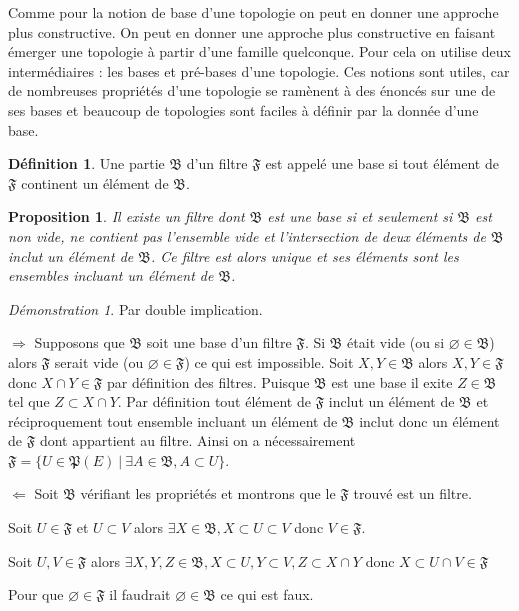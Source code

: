 \documentclass[a4paper, 11pt, french]{book}
\newenvironment{itemise}{\itemize}{\enditemize}
\theoremstyle{plain} %
\newtheorem{proposition}{Proposition}
\theoremstyle{definition} %
\newtheorem{definition}{Définition}
\theoremstyle{remark} %
\newtheorem*{demonstration}{Démonstration}
\newcommand{\1}{\mathds{1}}
\newcommand\vide{\varnothing}
\renewcommand{\frak}[1]{\mathfrak{#1}}
\newcommand\ens[2]{\{#1 \ |\ #2\}}
\newcommand\equivalence[3]{
	\begin{demonstration}
		#1
		\begin{itemise}
			\item[$\Longrightarrow$] #2
			\item[$\Longleftarrow$] #3
		\end{itemise}
	\end{demonstration}
}
\begin{document}
Comme pour la notion de base d'une topologie on peut en donner une approche plus constructive.
On peut en donner une approche plus constructive en faisant émerger une topologie à partir d'une famille quelconque.
Pour cela on utilise deux intermédiaires : les bases et pré-bases d'une topologie.
Ces notions sont utiles, car de nombreuses propriétés d'une topologie se ramènent à des énoncés sur une de ses bases et beaucoup de topologies sont faciles à définir par la donnée d'une base. 

\begin{definition}
 Une partie $\frak{B}$ d'un filtre $\frak{F}$ est appelé une base si tout élément de $\frak{F}$ continent un élément de $\frak{B}$.
\end{definition}

\begin{proposition}
	Il existe un filtre dont $\frak{B}$ est une base si et seulement si $\frak{B}$ est non vide, ne contient pas l'ensemble vide et l'intersection de deux éléments de $\frak{B}$ inclut un élément de $\frak{B}$.
	Ce filtre est alors unique et ses éléments sont les ensembles incluant un élément de $\frak{B}$.
\end{proposition}

\equivalence{Par double implication.}{
	Supposons que $\frak{B}$ soit une base d'un filtre $\frak{F}$.
	Si $\frak{B}$ était vide (ou si $\vide\in\frak{B}$) alors $\frak{F}$ serait vide (ou $\vide\in\frak{F}$) ce qui est impossible.
	Soit $X, Y\in\frak{B}$ alors $X, Y\in\frak{F}$ donc $X\cap Y\in\frak{F}$ par définition des filtres.
	Puisque $\frak{B}$ est une base il exite $Z\in\frak{B}$ tel que $Z\subset X\cap Y$.
	Par définition tout élément de $\frak{F}$ inclut un élément de $\frak{B}$ et réciproquement tout ensemble incluant un élément de $\frak{B}$ inclut donc un élément de $\frak{F}$ dont appartient au filtre.
	Ainsi on a nécessairement $\frak{F}=\ens{U\in\frak{P}(E)}{\exists A\in\frak{B}, A\subset U}$.
}{
	Soit $\frak{B}$ vérifiant les propriétés et montrons que le $\frak{F}$ trouvé est un filtre.
	\begin{itemise}
		\item Soit $U\in\frak{F}$ et $U\subset V$ alors $\exists X\in\frak{B}, X\subset U\subset V$ donc $V\in\frak{F}$.
		\item Soit $U, V\in\frak{F}$ alors $\exists X, Y, Z\in\frak{B}, X\subset U, Y\subset V, Z\subset X\cap Y$ donc $X\subset U\cap V\in\frak{F}$
		\item Pour que $\vide\in\frak{F}$ il faudrait $\vide\in\frak{B}$ ce qui est faux.
	\end{itemise}
}
\end{document}

